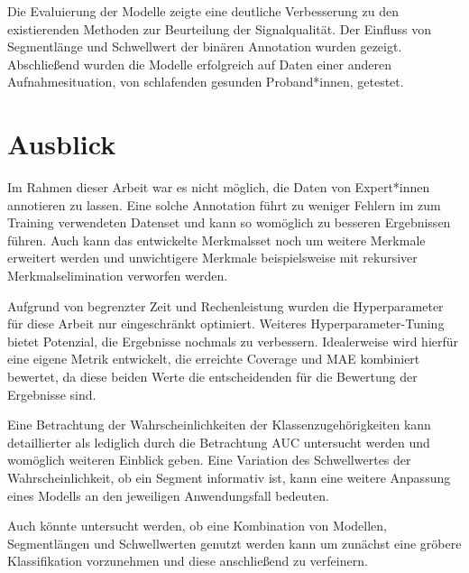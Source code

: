 Die Evaluierung der Modelle zeigte eine deutliche Verbesserung zu den existierenden Methoden zur Beurteilung der Signalqualität. Der Einfluss von Segmentlänge und Schwellwert der binären Annotation wurden gezeigt. Abschließend wurden die Modelle erfolgreich auf Daten einer anderen Aufnahmesituation, von schlafenden gesunden Proband*innen, getestet.

\section{Ausblick}

Im Rahmen dieser Arbeit war es nicht möglich, die Daten von Expert*innen annotieren zu lassen. Eine solche Annotation führt zu weniger Fehlern im zum Training verwendeten Datenset und kann so womöglich zu besseren Ergebnissen führen. Auch kann das entwickelte Merkmalsset noch um weitere Merkmale erweitert werden und unwichtigere Merkmale beispielsweise mit rekursiver Merkmalselimination verworfen werden.

Aufgrund von begrenzter Zeit und Rechenleistung wurden die Hyperparameter für diese Arbeit nur eingeschränkt optimiert. Weiteres Hyperparameter-Tuning bietet Potenzial, die Ergebnisse nochmals zu verbessern. Idealerweise wird hierfür eine eigene Metrik entwickelt, die erreichte Coverage und \ac{MAE} kombiniert bewertet, da diese beiden Werte die entscheidenden für die Bewertung der Ergebnisse sind.

Eine Betrachtung der Wahrscheinlichkeiten der Klassenzugehörigkeiten kann detaillierter als lediglich durch die Betrachtung \ac{AUC} untersucht werden und womöglich weiteren Einblick geben. Eine Variation des Schwellwertes der Wahrscheinlichkeit, ob ein Segment informativ ist, kann eine weitere Anpassung eines Modells an den jeweiligen Anwendungsfall bedeuten.

Auch könnte untersucht werden, ob eine Kombination von Modellen, Segmentlängen und Schwellwerten genutzt werden kann um zunächst eine gröbere Klassifikation vorzunehmen und diese anschließend zu verfeinern.




